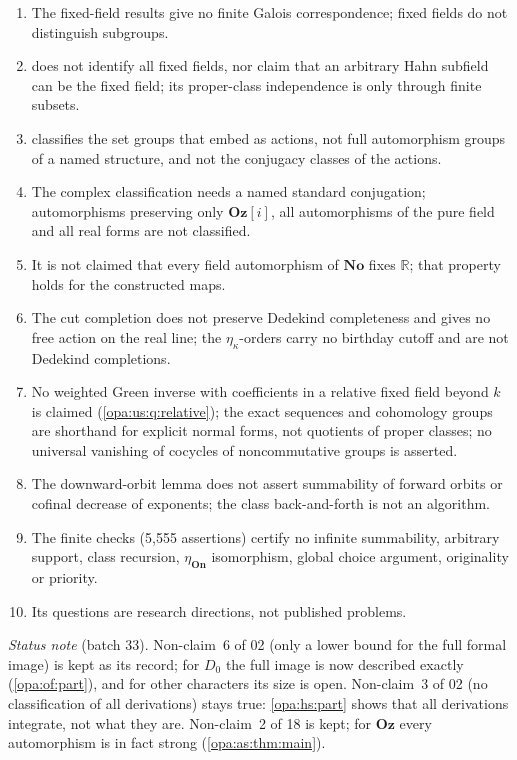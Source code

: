 \documentclass[11pt,oneside]{article}
\numberwithin{equation}{section}
\theoremstyle{definition}
\theoremstyle{remark}
\newcommand{\No}{\mathbf{No}}
\newcommand{\Oz}{\mathbf{Oz}}
\newcommand{\Og}{\mathbf{Oz}[i]}
\newcommand{\R}{\mathbb R}
\newcommand{\On}{\mathbf{On}}
\begin{document}
\begin{enumerate}[itemsep=1pt]
\item The fixed-field results give no finite Galois correspondence; fixed fields do not distinguish subgroups.
\item {} does not identify all fixed fields, nor claim that an arbitrary Hahn subfield can be the fixed field; its
proper-class independence is only through finite subsets.
\item {} classifies the set groups that embed as actions, not full automorphism groups of a named structure, and not the
conjugacy classes of the actions.
\item The complex classification needs a named standard conjugation; automorphisms preserving only $\Og$, all automorphisms of the pure field and
all real forms are not classified.
\item It is not claimed that every field automorphism of $\No$ fixes $\R$; that property holds for the constructed maps.
\item The cut completion does not preserve Dedekind completeness and gives no free action on the real line; the $\eta_\kappa$-orders carry no
birthday cutoff and are not Dedekind completions.
\item No weighted Green inverse with coefficients in a relative fixed field beyond $k$ is claimed (\cref{opa:us:q:relative}); the exact sequences
and cohomology groups are shorthand for explicit normal forms, not quotients of proper classes; no universal vanishing of cocycles of
noncommutative groups is asserted.
\item The downward-orbit lemma does not assert summability of forward orbits or cofinal decrease of exponents; the class back-and-forth is not an
algorithm.
\item The finite checks (5{,}555 assertions) certify no infinite summability, arbitrary support, class recursion, $\eta_\On$ isomorphism, global
choice argument, originality or priority.
\item Its questions are research directions, not published problems.
\end{enumerate}

\emph{Status note} (batch 33). Non-claim~6 of 02 (only a lower bound for the full formal image) is kept as its record; for $D_0$ the full
image is now described exactly (\cref{opa:of:part}), and for other characters its size is open. Non-claim~3 of 02 (no classification of
all derivations) stays true: \cref{opa:hs:part} shows that all derivations integrate, not what they are. Non-claim~2 of 18 is kept; for $\Oz$
every automorphism is in fact strong (\cref{opa:as:thm:main}).
\end{document}
